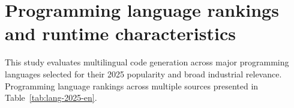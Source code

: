 \documentclass{llmxive}
\begin{document}

\section{Programming language rankings and runtime characteristics}
\label{app_rankings}

This study evaluates multilingual code generation across major programming languages selected for their 2025 popularity and broad industrial relevance. Programming language rankings across multiple sources presented in Table~\ref{tab:lang-2025-en}.
\end{document}
